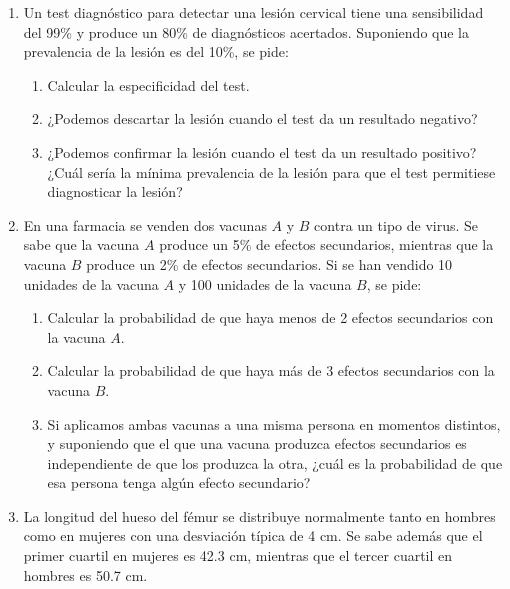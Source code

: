 \documentclass[12pt,a4paper]{article}
\begin{document}
\sloppy
{}
\begin{enumerate}
\item Un test diagnóstico para detectar una lesión cervical tiene una
  sensibilidad del 99\% y produce un 80\% de diagnósticos acertados.
  Suponiendo que la prevalencia de la lesión es del 10\%, se pide:

  \begin{enumerate}
  \item
    Calcular la especificidad del test.
  \item
    ¿Podemos descartar la lesión cuando el test da un resultado
    negativo?
  \item
    ¿Podemos confirmar la lesión cuando el test da un resultado
    positivo? ¿Cuál sería la mínima prevalencia de la lesión para que el
    test permitiese diagnosticar la lesión?
  \end{enumerate}

\item En una farmacia se venden dos vacunas \(A\) y \(B\) contra un tipo de
  virus. Se sabe que la vacuna \(A\) produce un 5\% de efectos
  secundarios, mientras que la vacuna \(B\) produce un 2\% de efectos
  secundarios. Si se han vendido 10 unidades de la vacuna \(A\) y 100
  unidades de la vacuna \(B\), se pide:

  \begin{enumerate}
  \item
    Calcular la probabilidad de que haya menos de 2 efectos secundarios
    con la vacuna \(A\).
  \item
    Calcular la probabilidad de que haya más de 3 efectos secundarios
    con la vacuna \(B\).
  \item
    Si aplicamos ambas vacunas a una misma persona en momentos
    distintos, y suponiendo que el que una vacuna produzca efectos
    secundarios es independiente de que los produzca la otra, ¿cuál es
    la probabilidad de que esa persona tenga algún efecto secundario?
  \end{enumerate}

\item
  La longitud del hueso del fémur se distribuye normalmente tanto en
  hombres como en mujeres con una desviación típica de 4 cm. Se sabe
  además que el primer cuartil en mujeres es 42.3 cm, mientras que el
  tercer cuartil en hombres es 50.7 cm.


\end{enumerate}
\end{document}
